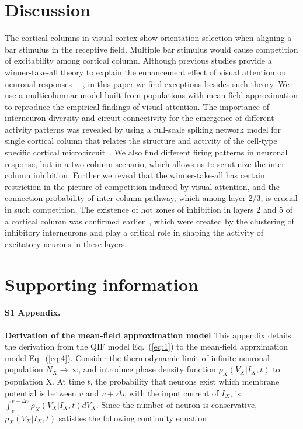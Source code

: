 \documentclass[10pt,letterpaper]{article}
\begin{document}
\section*{Discussion}
The cortical columns in visual cortex show orientation selection when aligning a bar stimulus in the receptive field. Multiple bar stimulus would cause competition of excitability among cortical column. Although previous studies provide a winner-take-all theory to explain the enhancement effect of visual attention on neuronal responses ~\cite{fukai1997}~\cite{wagatsuma2011}, in this paper we find exceptions besides such theory. We use a multicolumnar model built from populations with mean-field approximation to reproduce the empirical findings of visual attention.
The importance of interneuron diversity and circuit connectivity for the emergence of different activity patterns was revealed by using a full-scale spiking network model for single cortical column that relates the structure and activity of the cell-type specific cortical microcircuit~\cite{potjans2012}. We also find different firing patterns in neuronal response, but in a two-column scenario, which allows us to scrutinize the inter-column inhibition.
Further we reveal that the winner-take-all has certain restriction in the picture of competition induced by visual attention, and the connection probability of inter-column pathway, which among layer 2/3, is crucial in such competition. 
The existence of hot zones of inhibition in layers 2 and 5 of a cortical column was confirmed earlier~\cite{meyer2011}, which were created by the clustering of inhibitory interneurons and play a critical role in shaping the activity of excitatory neurons in these layers.

\section*{Supporting information}


\paragraph*{S1 Appendix.}
\label{S1_Appendix}
{\bf Derivation of the mean-field approximation model} This appendix details the derivation from the QIF model Eq.~(\ref{eq:1}) to the mean-field apprximation model Eq.~(\ref{eq:4}). Consider the thermodynamic limit of infinite neuronal population $N_{X}\xrightarrow{}\infty$, and introduce phase density function $\rho_{X}(V_{X}|I_{X},t)$ to population X. At time $t$, the probability that neurons exist which membrane potential is between $v$ and $v+\Delta v$ with the input current of $I_{X}$, is $\int_{v}^{v+\Delta v}\rho_{X}(V_{X}|I_{X},t)dV_{X}$. Since the number of neuron is conservative, $\rho_{X}(V_{X}|I_{X},t)$ satisfies the following continuity equation
\end{document}
